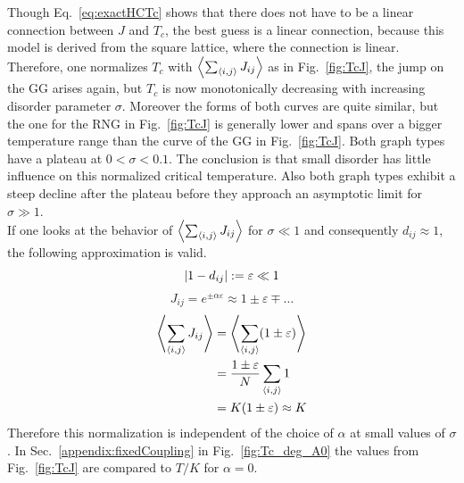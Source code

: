         Though Eq.\ \eqref{eq:exactHCTc} shows that there does not have
        to be a linear connection between \(J\) and \(T_c\), the best guess
        is a linear connection, because this model is derived from the
        square lattice, where the connection is linear. Therefore, one
        normalizes \(T_c\) with \(\left< \sum_{\left< i,j \right>} J_{ij} \right>\) as in
        Fig.\ \ref{fig:TcJ}, the
        jump on the GG arises again, but \(T_c\) is now monotonically
        decreasing with increasing disorder parameter \(\sigma\).
        Moreover the forms of both curves are quite similar, but the
        one for the RNG in Fig.\ \ref{fig:TcJ}
        is generally lower and spans over a bigger temperature range than
        the curve of the GG in Fig.\ \ref{fig:TcJ}.
        Both graph types have a plateau at \(0 < \sigma < 0.1\). The conclusion
        is that small disorder has little influence on this normalized critical
        temperature.
        Also both graph types exhibit a steep decline after the plateau before
        they approach an asymptotic limit for \(\sigma \gg 1\).\\
        If one looks at the behavior of \(\left< \sum_{\left< i,j \right>} J_{ij} \right>\)
        for \(\sigma \ll 1\) and consequently \(d_{ij} \approx 1\), the
        following approximation is valid.
        \begin{equation}
            \left\vert1-d_{ij}\right\vert := \varepsilon \ll 1
        \end{equation}
        \begin{equation}
            J_{ij} = e^{\pm \alpha \varepsilon} \approx 1 \pm \varepsilon \mp \dots
        \end{equation}
        \begin{align}
            \left< \sum_{\left< i,j \right>} J_{ij} \right> &= \left< \sum_{\left< i,j \right>} (1 \pm \varepsilon) \right> \\
                                          &= \frac{1 \pm \varepsilon}{N} \sum_{\left< i,j \right>} 1 \\
                                          &= K(1 \pm \varepsilon) \approx K
        \end{align}
        Therefore this normalization is independent of the choice of \(\alpha\)
        at small values of \(\sigma\). In Sec.\ \ref{appendix:fixedCoupling}
        in Fig.\ \ref{fig:Tc_deg_A0}
        the values from Fig.\ \ref{fig:TcJ}
        are compared to \(T / K\) for \(\alpha = 0\).

